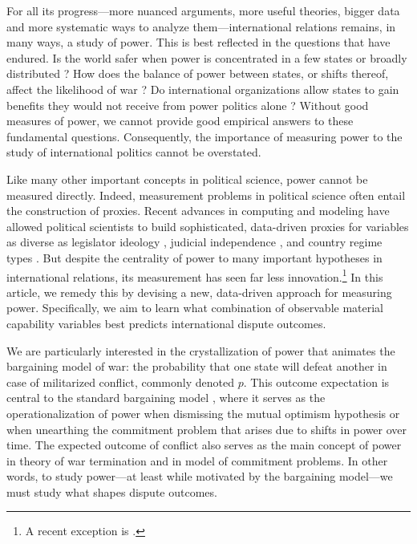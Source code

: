 
For all its progress---more nuanced arguments, more useful theories, bigger data and more systematic ways to analyze them---international relations remains, in many ways, a study of power.
This is best reflected in the questions that have endured.
Is the world safer when power is concentrated in a few states or broadly distributed \citep{waltz}?
How does the balance of power between states, or shifts thereof, affect the likelihood of war \citep{organski1980,powell1999,powell2006war}?
Do international organizations allow states to gain benefits they would not receive from power politics alone \citep{keohanenye}?
Without good measures of power, we cannot provide good empirical answers to these fundamental questions.
Consequently, the importance of measuring power to the study of international politics cannot be overstated.

Like many other important concepts in political science, power cannot be measured directly.
Indeed, measurement problems in political science often entail the construction of proxies.
Recent advances in computing and modeling have allowed political scientists to build sophisticated, data-driven proxies for variables as diverse as legislator ideology \citep{clinton2004}, judicial independence \citep{linzer2014}, and country regime types \citep{jackman2008}.
But despite the centrality of power to many important hypotheses in international relations, its measurement has seen far less innovation.\footnote{%
  A recent exception is \citet{Arena:2012}.
}
In this article, we remedy this by devising a new, data-driven approach for measuring power.
Specifically, we aim to learn what combination of observable material capability variables best predicts international dispute outcomes.

We are particularly interested in the crystallization of power that animates the bargaining model of war:  the probability that one state will defeat another in case of militarized conflict, commonly denoted $p$.
This outcome expectation is central to the standard bargaining model \citep{fearon1995}, where it serves as the operationalization of power when dismissing the mutual optimism hypothesis or when unearthing the commitment problem that arises due to shifts in power over time.
The expected outcome of conflict also serves as the main concept of power in  theory of war termination and in  model of commitment problems.
In other words, to study power---at least while motivated by the bargaining model---we must study what shapes dispute outcomes.

